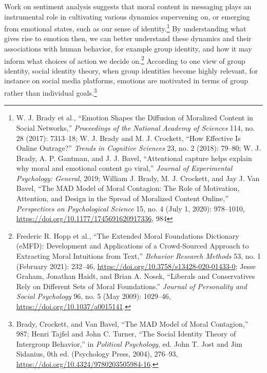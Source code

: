 \documentclass[phdthesis,12pt,final,a4paper]{wuthesis}
\theoremstyle{definition}
\theoremstyle{definition}
\theoremstyle{definition}
\theoremstyle{definition}
\theoremstyle{remark}
\begin{document}
Work on sentiment analysis suggests that moral content in messaging plays an instrumental role in cultivating various dynamics supervening on, or emerging from emotional states, such as our sense of identity.\footnote{W. J. Brady et al., {``Emotion Shapes the Diffusion of Moralized Content in Social Networks,''} \emph{Proceedings of the National Academy of Sciences} 114, no. 28 (2017): 7313--18; W. J. Brady and M. J. Crockett, {``How Effective Is Online Outrage?''} \emph{Trends in Cognitive Sciences} 23, no. 2 (2018): 79--80; W. J. Brady, A. P. Gantman, and J. J. Bavel, {``Attentional capture helps explain why moral and emotional content go viral,''} \emph{Journal of Experimental Psychology: General}, 2019; William J. Brady, M. J. Crockett, and Jay J. Van Bavel, {``The {MAD} Model of Moral Contagion: The Role of Motivation, Attention, and Design in the Spread of Moralized Content Online,''} \emph{Perspectives on Psychological Science} 15, no. 4 (July 1, 2020): 978--1010, \url{https://doi.org/10.1177/1745691620917336}, 984} By understanding what gives rise to emotion then, we can better understand these dynamics and their associations with human behavior, for example group identity, and how it may inform what choices of action we decide on.\footnote{Frederic R. Hopp et al., {``The Extended {Moral Foundations Dictionary} ({eMFD}): {Development} and Applications of a Crowd-Sourced Approach to Extracting Moral Intuitions from Text,''} \emph{Behavior Research Methods} 53, no. 1 (February 2021): 232--46, \url{https://doi.org/10.3758/s13428-020-01433-0}; Jesse Graham, Jonathan Haidt, and Brian A. Nosek, {``Liberals and Conservatives Rely on Different Sets of Moral Foundations.''} \emph{Journal of Personality and Social Psychology} 96, no. 5 (May 2009): 1029--46, \url{https://doi.org/10.1037/a0015141}.} According to one view of group identity, social identity theory, when group identities become highly relevant, for instance on social media platforms, emotions are motivated in terms of group rather than individual goals.\footnote{Brady, Crockett, and Van Bavel, {``The {MAD} Model of Moral Contagion,''} 987; Henri Tajfel and John C. Turner, {``The {Social Identity Theory} of {Intergroup Behavior},''} in \emph{Political {Psychology}}, ed. John T. Jost and Jim Sidanius, 0th ed. (Psychology Press, 2004), 276--93, \url{https://doi.org/10.4324/9780203505984-16}.}
\end{document}
